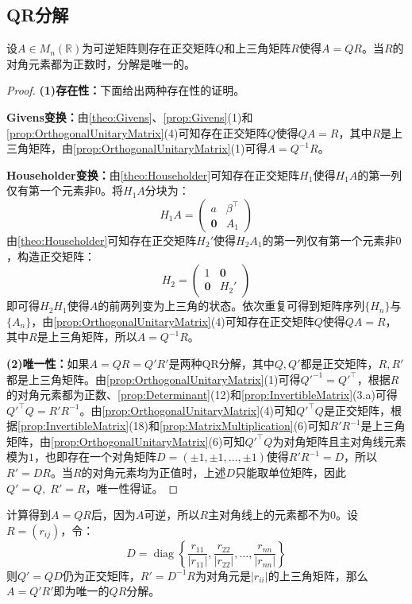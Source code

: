\subsection{QR分解}
\begin{theorem}\label{theo:QR}
	设$A\in M_{n}(\mathbb{R})$为可逆矩阵则存在正交矩阵$Q$和上三角矩阵$R$使得$A=QR$。当$R$的对角元素都为正数时，分解是唯一的。
\end{theorem}
\begin{proof}
	\textbf{(1)存在性：}下面给出两种存在性的证明。\par
	\textbf{Givens变换：}由\cref{theo:Givens}、\cref{prop:Givens}(1)和\cref{prop:OrthogonalUnitaryMatrix}(4)可知存在正交矩阵$Q$使得$QA=R$，其中$R$是上三角矩阵，由\cref{prop:OrthogonalUnitaryMatrix}(1)可得$A=Q^{-1}R$。\par
	\textbf{Householder变换：}由\cref{theo:Householder}可知存在正交矩阵$H_1$使得$H_1A$的第一列仅有第一个元素非$0$。将$H_1A$分块为：
	\begin{equation*}
		H_1A=
		\begin{pmatrix}
			a & \beta^{\top} \\
			\mathbf{0} & A_1
		\end{pmatrix}
	\end{equation*}
	由\cref{theo:Householder}可知存在正交矩阵$H_2'$使得$H_2A_1$的第一列仅有第一个元素非$0$，构造正交矩阵：
	\begin{equation*}
		H_2=
		\begin{pmatrix}
			1 & \mathbf{0} \\
			\mathbf{0} & H_2'
		\end{pmatrix}
	\end{equation*}
	即可得$H_2H_1$使得$A$的前两列变为上三角的状态。依次重复可得到矩阵序列$\{H_n\}$与$\{A_n\}$，由\cref{prop:OrthogonalUnitaryMatrix}(4)可知存在正交矩阵$Q$使得$QA=R$，其中$R$是上三角矩阵，所以$A=Q^{-1}R$。\par
	\textbf{(2)唯一性：}如果$A=QR=Q'R'$是两种QR分解，其中$Q,Q'$都是正交矩阵，$R,R'$都是上三角矩阵。由\cref{prop:OrthogonalUnitaryMatrix}(1)可得$Q'^{-1}=Q'^{\top}$，根据$R$的对角元素都为正数、\cref{prop:Determinant}(12)和\cref{prop:InvertibleMatrix}(3.a)可得$Q'^{\top}Q=R'R^{-1}$。由\cref{prop:OrthogonalUnitaryMatrix}(4)可知$Q'^{\top}Q$是正交矩阵，根据\cref{prop:InvertibleMatrix}(18)和\cref{prop:MatrixMultiplication}(6)可知$R'R^{-1}$是上三角矩阵，由\cref{prop:OrthogonalUnitaryMatrix}(6)可知$Q'^{\top}Q$为对角矩阵且主对角线元素模为$1$，也即存在一个对角矩阵$D=(\pm1,\pm1,\dots,\pm1)$使得$R'R^{-1}=D$，所以$R'=DR$。当$R$的对角元素均为正值时，上述$D$只能取单位矩阵，因此$Q'=Q,\;R'=R$，唯一性得证。
\end{proof}
\begin{note}
	计算得到$A=QR$后，因为$A$可逆，所以$R$主对角线上的元素都不为$0$。设$R=(r_{ij})$，令：
	\begin{equation*}
		D=\operatorname{diag}\left\{\frac{r_{11}}{|r_{11}|},\frac{r_{22}}{|r_{22}|},\dots,\frac{r_{nn}}{|r_{nn}|}\right\}
	\end{equation*}
	则$Q'=QD$仍为正交矩阵，$R'=D^{-1}R$为对角元是$|r_{ii}|$的上三角矩阵，那么$A=Q'R'$即为唯一的$QR$分解。
\end{note}

